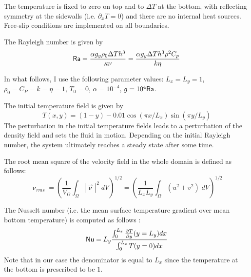 The temperature is fixed to zero on top and to $\Delta T$ at the bottom, 
with reflecting symmetry at the sidewalls (i.e. $\partial_x T=0$) 
and there are no internal heat sources. 
Free-slip conditions are implemented on all boundaries. 

The Rayleigh number is given by
\begin{equation}
{\mathsf{Ra}} = \frac{\alpha g_y \rho_0 \Delta T h^3 }{\kappa \nu}
=\frac{\alpha g_y \Delta T h^3 \rho^2 C_p}{k \eta}
\end{equation}

In what follows, I use the following parameter values:  
$L_x=L_y=1$, $\rho_0=C_P=k=\eta=1$, $T_0=0$, $\alpha=10^{-4}$, $g=10^{4}{\mathsf{Ra}}$.

The initial temperature field is given by 
\begin{equation}
T(x,y)=(1-y) - 0.01\cos(\pi x/L_x) \sin(\pi y/L_y)
\end{equation}
The perturbation in the initial temperature fields leads to 
a perturbation of the density field and sets the fluid in motion. 
Depending on the initial Rayleigh number, the system ultimately reaches a 
steady state after some time. 

The root mean square of the velocity field in the whole domain is defined as 
follows:
\begin{equation}
\upnu_{rms}
= \left( \frac{1}{V_\Omega} \int_\Omega |{\vec \upnu}|^2 \; dV \right)^{1/2} 
= \left( \frac{1}{L_xL_y} \int_\Omega (u^2+v^2) \; dV \right)^{1/2} 
\label{eq_vrms}
\end{equation}


The Nusselt number (i.e. the mean surface temperature gradient over mean bottom temperature)
is computed as follows \cite{blbc89}:
\begin{equation}
{\mathsf{Nu}} = L_y \frac{\int_0^{L_x} \frac{\partial T}{\partial y}(y=L_y) dx  }{\int_0^{L_x} T(y=0) dx}
\end{equation}
Note that in our case the denominator is equal to $L_x$ since the temperature at the 
bottom is prescribed to be 1.

